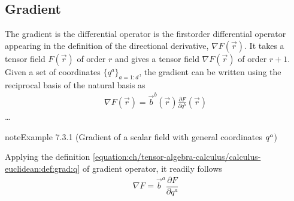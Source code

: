 \documentclass[letterpaper,10pt,english]{jupyterBook}
\begin{document}
\subsection{Gradient}
\label{\detokenize{ch/tensor-algebra-calculus/calculus-euclidean:gradient}}\label{\detokenize{ch/tensor-algebra-calculus/calculus-euclidean:tensor-calculus-differential-operators-gradient}}
\sphinxAtStartPar
The gradient is the differential operator is the first\sphinxhyphen{}order differential operator appearing in the definition of the directional derivative, \(\nabla F(\vec{r})\). It takes a tensor field \(F(\vec{r})\) of order \(r\) and gives a tensor field \(\nabla F(\vec{r})\) of order \(r+1\). Given a set of coordinates \(\{q^a\}_{a=1:d}\), the gradient can be written using the reciprocal basis of the natural basis as
\begin{equation}\label{equation:ch/tensor-algebra-calculus/calculus-euclidean:def:grad:q}
\begin{split}\nabla F(\vec{r}) = \vec{b}^b(\vec{r}) \frac{\partial F}{\partial q^b}(\vec{r})\end{split}
\end{equation}
\sphinxAtStartPar
{} …
\label{ch/tensor-algebra-calculus/calculus-euclidean:example-4}
\begin{sphinxadmonition}{note}{Example 7.3.1 (Gradient of a scalar field \sphinxhyphen{} with general coordinates \protect\(q^{a}\protect\))}



\sphinxAtStartPar
Applying the definition \eqref{equation:ch/tensor-algebra-calculus/calculus-euclidean:def:grad:q} of gradient operator, it readily follows
\begin{equation*}
\begin{split}\nabla F = \vec{b}^a \dfrac{\partial F}{\partial q^a}\end{split}
\end{equation*}\end{sphinxadmonition}
\label{ch/tensor-algebra-calculus/calculus-euclidean:example-5}
\end{document}
